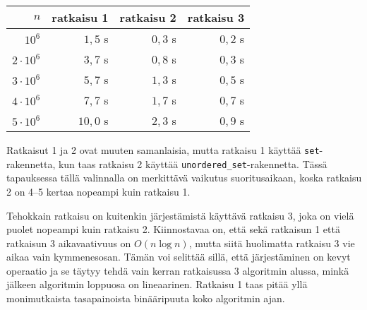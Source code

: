 \begin{center}
\begin{tabular}{rrrr}
$n$ & ratkaisu 1 & ratkaisu 2 & ratkaisu 3 \\
\hline
$10^6$ & $1{,}5$ s & $0{,}3$ s & $0{,}2$ s \\
$2 \cdot 10^6$ & $3{,}7$ s & $0{,}8$ s & $0{,}3$ s \\
$3 \cdot 10^6$ & $5{,}7$ s & $1{,}3$ s & $0{,}5$ s \\
$4 \cdot 10^6$ & $7{,}7$ s & $1{,}7$ s & $0{,}7$ s \\
$5 \cdot 10^6$ & $10{,}0$ s & $2{,}3$ s & $0{,}9$ s \\
\end{tabular}
\end{center}

Ratkaisut 1 ja 2 ovat muuten samanlaisia,
mutta ratkaisu 1 käyttää \texttt{set}-rakennetta,
kun taas ratkaisu 2 käyttää
\texttt{unordered\_set}-rakennetta.
Tässä tapauksessa tällä valinnalla on
merkittävä vaikutus suoritusaikaan,
koska ratkaisu 2 on 4–5 kertaa
nopeampi kuin ratkaisu 1.

Tehokkain ratkaisu on kuitenkin järjestämistä
käyttävä ratkaisu 3, joka on vielä puolet
nopeampi kuin ratkaisu 2.
Kiinnostavaa on, että sekä ratkaisun 1 että
ratkaisun 3 aikavaativuus on $O(n \log n)$,
mutta siitä huolimatta
ratkaisu 3 vie aikaa vain kymmenesosan.
Tämän voi selittää sillä, että
järjestäminen on kevyt
operaatio ja se täytyy tehdä vain kerran
ratkaisussa 3 algoritmin alussa,
minkä jälkeen algoritmin loppuosa on lineaarinen.
Ratkaisu 1 taas pitää yllä monimutkaista
tasapainoista binääripuuta koko algoritmin ajan.